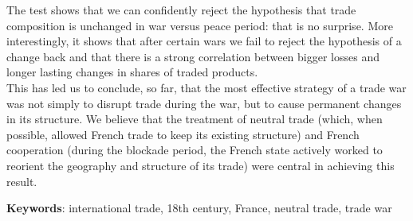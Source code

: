 \documentclass[12pt,a4paper,notitlepage]{article}
\begin{document}
The test shows that we can confidently reject the hypothesis that trade composition is unchanged in war versus peace period: that is no surprise.
More interestingly, it shows that after certain wars we fail to reject the hypothesis of a change back and that there is a strong correlation between bigger losses and longer lasting changes in shares of traded products. \\
This has led us to conclude, so far, that the most effective strategy of a trade war was not simply to disrupt trade during the war, but to cause permanent changes in its structure.
We believe that the treatment of neutral trade (which, when possible, allowed French trade to keep its existing structure) and French cooperation (during the blockade period, the French state actively worked to reorient the geography and structure of its trade) were central in achieving this result.



\textbf{Keywords}: international trade, 18th century, France, neutral trade, trade war


\renewcommand{\baselinestretch}{1.0}\normalsize


\end{document}
